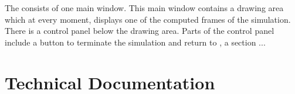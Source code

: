 \documentclass{article}
\begin{document}
The \itwo{} consists of one main window. This main window contains a drawing area which at every moment, displays one of the computed frames of the simulation. There is a control panel below the drawing area. Parts of the control panel include a button to terminate the simulation and return to \ione{}, a section  ...

\section{Technical Documentation}
\end{document}
